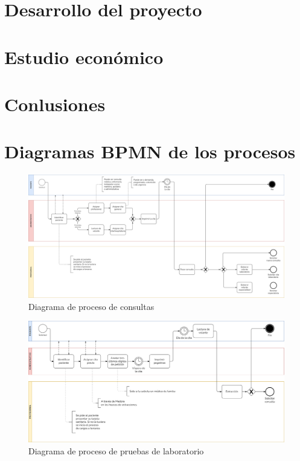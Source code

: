 \documentclass[12pt, a4paper, twoside, openright]{report}
\begin{document}
\chapter{Desarrollo del proyecto}


\chapter{Estudio económico}


\chapter{Conlusiones}


\appendix
\chapter{Diagramas BPMN de los procesos }

\begin{figure}
    \centering
    \begin{sideways}
        \includegraphics[width=0.95\textheight]{img/proceso-consultas.png}
    \end{sideways}
    \caption{Diagrama de proceso de consultas}
    \label{fig:proceso-consultas}
\end{figure}

\begin{figure}
    \centering
    \begin{sideways}
        \includegraphics[width=0.95\textheight]{img/proceso-pruebas.png}
    \end{sideways}
    \caption{Diagrama de proceso de pruebas de laboratorio}
    \label{fig:proceso-pruebas}
\end{figure}
\end{document}
